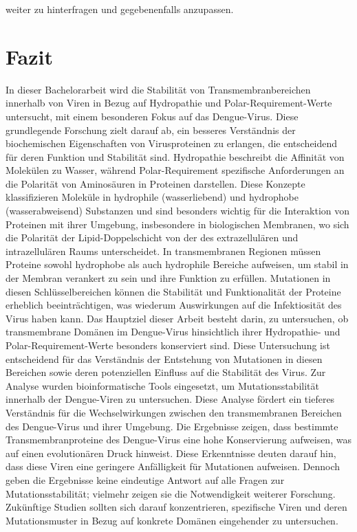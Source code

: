 \documentclass[german,version-2022-01]{uzl-thesis}
\begin{document}
weiter zu hinterfragen und gegebenenfalls anzupassen.

\chapter{Fazit}


%

In dieser Bachelorarbeit wird die Stabilit\"at von Transmembranbereichen innerhalb von Viren in Bezug auf Hydropathie und Polar-Requirement-Werte untersucht, mit einem besonderen Fokus auf das Dengue-Virus. Diese grundlegende Forschung zielt darauf ab, ein besseres Verst\"andnis der biochemischen Eigenschaften von Virusproteinen zu erlangen, die entscheidend f\"ur deren Funktion und Stabilit\"at sind. Hydropathie beschreibt die Affinit\"at von Molek\"ulen zu Wasser, w\"ahrend Polar-Requirement spezifische Anforderungen an die Polarit\"at von Aminos\"auren in Proteinen darstellen. Diese Konzepte klassifizieren Molek\"ule in hydrophile (wasserliebend) und hydrophobe (wasserabweisend) Substanzen und sind besonders wichtig f\"ur die Interaktion von Proteinen mit ihrer Umgebung, insbesondere in biologischen Membranen, wo sich die Polarit\"at der Lipid-Doppelschicht von der des extrazellul\"aren und intrazellul\"aren Raums unterscheidet. In transmembranen Regionen m\"ussen Proteine sowohl hydrophobe als auch hydrophile Bereiche aufweisen, um stabil in der Membran verankert zu sein und ihre Funktion zu erf\"ullen. Mutationen in diesen Schl\"usselbereichen k\"onnen die Stabilit\"at und Funktionalit\"at der Proteine erheblich beeintr\"achtigen, was wiederum Auswirkungen auf die Infektiosit\"at des Virus haben kann. Das Hauptziel dieser Arbeit besteht darin, zu untersuchen, ob transmembrane Dom\"anen im Dengue-Virus hinsichtlich ihrer Hydropathie- und Polar-Requirement-Werte besonders konserviert sind. Diese Untersuchung ist entscheidend f\"ur das Verst\"andnis der Entstehung von Mutationen in diesen Bereichen sowie deren potenziellen Einfluss auf die Stabilit\"at des Virus. Zur Analyse wurden bioinformatische Tools eingesetzt, um Mutationsstabilit\"at innerhalb der Dengue-Viren zu untersuchen. Diese Analyse f\"ordert ein tieferes Verst\"andnis f\"ur die Wechselwirkungen zwischen den transmembranen Bereichen des Dengue-Virus und ihrer Umgebung. Die Ergebnisse zeigen, dass bestimmte Transmembranproteine des Dengue-Virus eine hohe Konservierung aufweisen, was auf einen evolution\"aren Druck hinweist. Diese Erkenntnisse deuten darauf hin, dass diese Viren eine geringere Anf\"alligkeit f\"ur Mutationen aufweisen. Dennoch geben die Ergebnisse keine eindeutige Antwort auf alle Fragen zur Mutationsstabilit\"at; vielmehr zeigen sie die Notwendigkeit weiterer Forschung. Zuk\"unftige Studien sollten sich darauf konzentrieren, spezifische Viren und deren Mutationsmuster in Bezug auf konkrete Dom\"anen eingehender zu untersuchen. 
\end{document}
